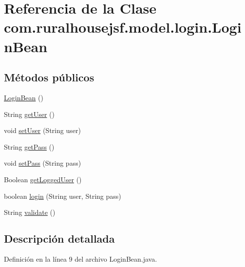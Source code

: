 \hypertarget{classcom_1_1ruralhousejsf_1_1model_1_1login_1_1_login_bean}{}\section{Referencia de la Clase com.\+ruralhousejsf.\+model.\+login.\+Login\+Bean}
\label{classcom_1_1ruralhousejsf_1_1model_1_1login_1_1_login_bean}
\subsection*{Métodos públicos}
\begin{DoxyCompactItemize}
\item 
\mbox{\hyperlink{classcom_1_1ruralhousejsf_1_1model_1_1login_1_1_login_bean_ae77b2f684ab6b7fc6f4fd4274ccd2c84}{Login\+Bean}} ()
\item 
String \mbox{\hyperlink{classcom_1_1ruralhousejsf_1_1model_1_1login_1_1_login_bean_ab0769180b1eaf69f94f0aa181fc2dd40}{get\+User}} ()
\item 
void \mbox{\hyperlink{classcom_1_1ruralhousejsf_1_1model_1_1login_1_1_login_bean_a87f309a4e8c32ad0246198b72ef45458}{set\+User}} (String user)
\item 
String \mbox{\hyperlink{classcom_1_1ruralhousejsf_1_1model_1_1login_1_1_login_bean_ace5538b87e614420da9c6ce31a5c7cef}{get\+Pass}} ()
\item 
void \mbox{\hyperlink{classcom_1_1ruralhousejsf_1_1model_1_1login_1_1_login_bean_a5c0db493f5898894994d767564c9b493}{set\+Pass}} (String pass)
\item 
Boolean \mbox{\hyperlink{classcom_1_1ruralhousejsf_1_1model_1_1login_1_1_login_bean_acfc1e8aa6bd2b829d5115a5dc7e8d3d6}{get\+Logged\+User}} ()
\item 
boolean \mbox{\hyperlink{classcom_1_1ruralhousejsf_1_1model_1_1login_1_1_login_bean_a1d87bc3b800e6c4a0b3986d7671334fd}{login}} (String user, String pass)
\item 
String \mbox{\hyperlink{classcom_1_1ruralhousejsf_1_1model_1_1login_1_1_login_bean_ac3b4153fa4416dc62d107ae2005a9ee8}{validate}} ()
\end{DoxyCompactItemize}


\subsection{Descripción detallada}


Definición en la línea 9 del archivo Login\+Bean.\+java.



